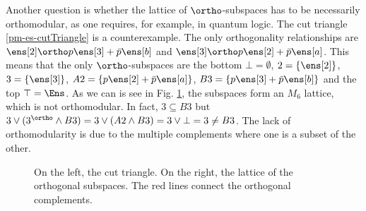 Another question is whether the lattice of $\ortho$-subspaces has to be necessarily orthomodular, as one requires, for example, in quantum logic. The cut triangle \ref{pm-es-cutTriangle} is a counterexample. The only orthogonality relationships are $\ens[2] \ortho p \ens[3] + \bar{p}\ens[b]$ and $\ens[3] \ortho p \ens[2] + \bar{p}\ens[a]$. This means that the only $\ortho$-subspaces are the bottom $\bot = \emptyset$, $2= \{\ens[2]\}$, $3= \{\ens[3]\}$, $A2= \{p \ens[2] + \bar{p}\ens[a]\}$, $B3= \{p \ens[3] + \bar{p}\ens[b]\}$ and the top $\top = \Ens$. As we can is see in Fig. \ref{pm-es-fig-cutTriangleOrthoSubspaces}, the subspaces form an $M_6$ lattice, which is not orthomodular. In fact, $3 \subseteq B3$ but $3 \vee (3^{\ortho} \wedge B3) = 3 \vee (A2 \wedge B3) = 3 \vee \bot = 3 \neq B3$. The lack of orthomodularity is due to the multiple complements where one is a subset of the other.

\begin{figure}[H]
	\centering
	\caption{On the left, the cut triangle. On the right, the lattice of the orthogonal subspaces. The red lines connect the orthogonal complements.}\label{pm-es-fig-cutTriangleOrthoSubspaces}
\end{figure}

